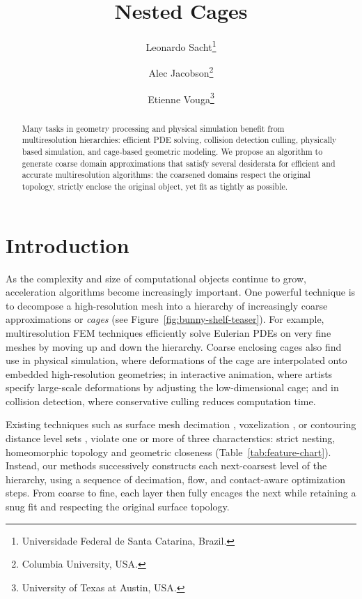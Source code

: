 \documentclass{cgyrf15}
\title{Nested Cages}
\author{
Leonardo Sacht\thanks{Universidade Federal de Santa Catarina, Brazil.} \and
Alec Jacobson\thanks{Columbia University, USA.} \and
Etienne Vouga\thanks{University of Texas at Austin, USA.} 
}
\begin{document}
\maketitle

\begin{abstract}
Many tasks in geometry processing and physical simulation benefit from
multiresolution hierarchies: efficient PDE solving, collision detection
culling, physically based simulation, and cage-based geometric modeling. We
propose an algorithm to generate coarse domain approximations that satisfy
several desiderata for efficient and accurate multiresolution algorithms: the
coarsened domains respect the original topology, strictly enclose the original
object, yet fit as tightly as possible.
\end{abstract}

\section{Introduction}

As the complexity and size of computational objects continue to grow,
acceleration algorithms become increasingly important. One powerful technique
is to decompose a high-resolution mesh into a hierarchy of increasingly coarse
approximations or \emph{cages} (see Figure~\ref{fig:bunny-shelf-teaser}). For example,
multiresolution FEM techniques efficiently solve Eulerian PDEs on very fine
meshes by moving up and down the hierarchy.  Coarse enclosing cages also find
use in physical simulation, where deformations of the cage are interpolated
onto embedded high-resolution geometries; in interactive animation, where
artists specify large-scale deformations by adjusting the low-dimensional cage;
and in collision detection, where conservative culling reduces computation
time. 

Existing techniques such as surface mesh decimation \cite{Hoppe:1996:PM}, 
voxelization \cite{Xian:2009}, or
contouring distance level sets \cite{Shen:2004:IAI}, violate one or more of three characterstics:
strict nesting, homeomorphic topology and geometric closeness
(Table~\ref{tab:feature-chart}).  Instead, our methods successively constructs
each next-coarsest level of the hierarchy, using a sequence of decimation,
flow, and contact-aware optimization steps.  From coarse to fine, each layer
then fully encages the next while retaining a snug fit and respecting the
original surface topology.
\end{document}
